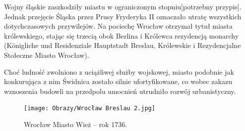 \documentclass{article}
\begin{document}
Wojny śląskie zaszkodziły miastu w ograniczonym stopniu[potrzebny przypis]. Jednak przejęcie Śląska przez Prusy Fryderyka II oznaczało utratę wszystkich dotychczasowych przywilejów. Na pociechę Wrocław otrzymał tytuł miasta królewskiego, stając się trzecią obok Berlina i Królewca rezydencją monarchy (Königliche und Residenziale Hauptstadt Breslau, Królewskie i Rezydencjalne Stołeczne Miasto Wrocław).

Choć ludność zwolniono z uciążliwej służby wojskowej, miasto podobnie jak konkurująca z nim Świdnica zostało silnie ufortyfikowane, co wobec zakazu wznoszenia budowli na przedpolu umocnień utrudniło rozwój urbanistyczny.
\begin{figure}[ht]
\centering
\texttt{[image: Obrazy/Wrocław Breslau 2.jpg]}
\caption{Wrocław Miasto Wież – rok 1736.}
\label{fig:breslau_2}
\end{figure}
\end{document}
